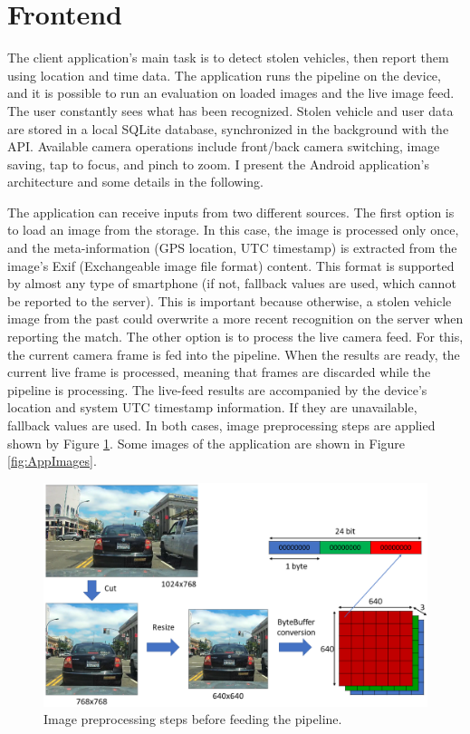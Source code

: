 \section{Frontend}

The client application's main task is to detect stolen vehicles, then report them using location and time data. The application runs the pipeline on the device, and it is possible to run an evaluation on loaded images and the live image feed. The user constantly sees what has been recognized. Stolen vehicle and user data are stored in a local SQLite database, synchronized in the background with the API. Available camera operations include front/back camera switching, image saving, tap to focus, and pinch to zoom. I present the Android application's architecture and some details in the following.

The application can receive inputs from two different sources. The first option is to load an image from the storage. In this case, the image is processed only once, and the meta-information (GPS location, UTC timestamp) is extracted from the image's Exif (Exchangeable image file format) content. This format is supported by almost any type of smartphone (if not, fallback values are used, which cannot be reported to the server). This is important because otherwise, a stolen vehicle image from the past could overwrite a more recent recognition on the server when reporting the match. The other option is to process the live camera feed. For this, the current camera frame is fed into the pipeline. When the results are ready, the current live frame is processed, meaning that frames are discarded while the pipeline is processing. The live-feed results are accompanied by the device's location and system UTC timestamp information. If they are unavailable, fallback values are used. In both cases, image preprocessing steps are applied shown by Figure \ref{fig:image_preprocessing}. Some images of the application are shown in Figure \ref{fig:AppImages}.

\begin{figure}[htb]
 \centerline{\includegraphics[width=0.9\columnwidth]{.//Figure/System/image_preprocessing.png}}
 \caption{Image preprocessing steps before feeding the pipeline.}
 \label{fig:image_preprocessing}
\end{figure}

